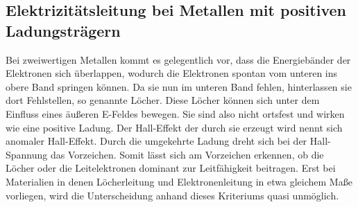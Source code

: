 \documentclass[titlepage=firstcover, captions=tableheading]{scrartcl}
\begin{document}
\subsection{Elektrizitätsleitung bei Metallen mit positiven Ladungsträgern}
Bei zweiwertigen Metallen kommt es gelegentlich vor, dass die Energiebänder der Elektronen sich überlappen, wodurch die Elektronen spontan vom unteren ins obere Band springen können. Da sie nun im unteren Band fehlen, hinterlassen sie dort Fehlstellen, so genannte Löcher. Diese Löcher können sich unter dem Einfluss eines äußeren E-Feldes bewegen. Sie sind also nicht ortsfest und wirken wie eine positive Ladung. Der Hall-Effekt der durch sie erzeugt wird nennt sich anomaler Hall-Effekt. Durch die umgekehrte Ladung dreht sich bei der Hall-Spannung das Vorzeichen. Somit lässt sich am Vorzeichen erkennen, ob die Löcher oder die Leitelektronen dominant zur Leitfähigkeit beitragen. Erst bei Materialien in denen Löcherleitung und Elektronenleitung in etwa gleichem Maße vorliegen, wird die Unterscheidung anhand dieses Kriteriums quasi unmöglich. 
\end{document}

